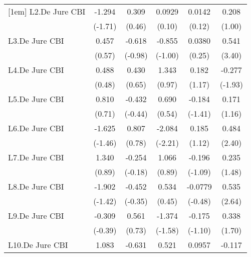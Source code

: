 {\begin{longtable}{l*{5}{c}}
[1em]
L2.De Jure CBI  &   -1.294         &    0.309         &   0.0929         &   0.0142         &    0.208         \\
                &  (-1.71)         &   (0.46)         &   (0.10)         &   (0.12)         &   (1.00)         \\
[1em]
L3.De Jure CBI  &    0.457         &   -0.618         &   -0.855         &   0.0380         &    0.541\sym{***}\\
                &   (0.57)         &  (-0.98)         &  (-1.00)         &   (0.25)         &   (3.40)         \\
[1em]
L4.De Jure CBI  &    0.488         &    0.430         &    1.343         &    0.182         &   -0.277         \\
                &   (0.48)         &   (0.65)         &   (0.97)         &   (1.17)         &  (-1.93)         \\
[1em]
L5.De Jure CBI  &    0.810         &   -0.432         &    0.690         &   -0.184         &    0.171         \\
                &   (0.71)         &  (-0.44)         &   (0.54)         &  (-1.41)         &   (1.16)         \\
[1em]
L6.De Jure CBI  &   -1.625         &    0.807         &   -2.084\sym{*}  &    0.185         &    0.484\sym{*}  \\
                &  (-1.46)         &   (0.78)         &  (-2.21)         &   (1.12)         &   (2.40)         \\
[1em]
L7.De Jure CBI  &    1.340         &   -0.254         &    1.066         &   -0.196         &    0.235         \\
                &   (0.89)         &  (-0.18)         &   (0.89)         &  (-1.09)         &   (1.48)         \\
[1em]
L8.De Jure CBI  &   -1.902         &   -0.452         &    0.534         &  -0.0779         &    0.535\sym{**} \\
                &  (-1.42)         &  (-0.35)         &   (0.45)         &  (-0.48)         &   (2.64)         \\
[1em]
L9.De Jure CBI  &   -0.309         &    0.561         &   -1.374         &   -0.175         &    0.338         \\
                &  (-0.39)         &   (0.73)         &  (-1.58)         &  (-1.10)         &   (1.70)         \\
[1em]
L10.De Jure CBI &    1.083         &   -0.631         &    0.521         &   0.0957         &   -0.117         \\

\end{longtable}}
